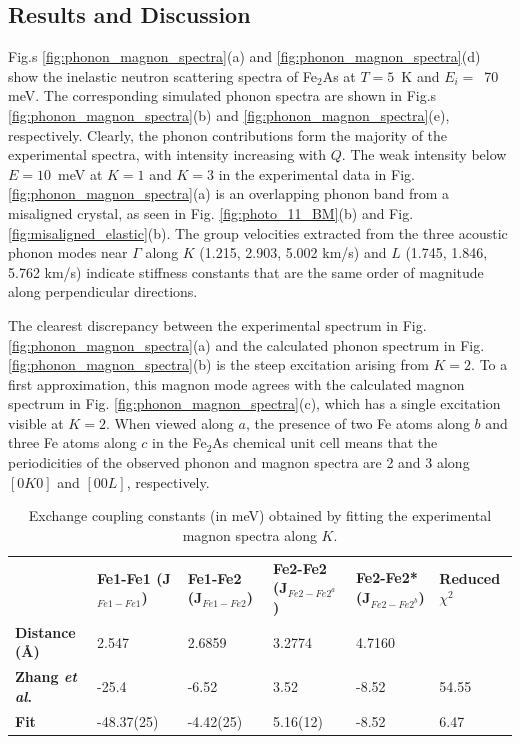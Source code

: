 \documentclass[letterpaper,10pt,doublespacing,edeposit]{uiucthesis2020}
\begin{document}
\begin{mainmatter}
\section{Results and Discussion}



Fig.s \ref{fig:phonon_magnon_spectra}(a) and \ref{fig:phonon_magnon_spectra}(d) show the inelastic neutron scattering spectra of Fe$_2$As at $T = 5$~K and $E_i =$~70 meV. The corresponding simulated phonon spectra are shown in Fig.s \ref{fig:phonon_magnon_spectra}(b) and \ref{fig:phonon_magnon_spectra}(e), respectively. Clearly, the phonon contributions form the majority of the experimental spectra, with intensity increasing with $Q$. 
The weak intensity below $E = 10$~meV  at $K = 1$ and $K = 3$ in the experimental data in Fig. \ref{fig:phonon_magnon_spectra}(a) is an overlapping phonon band from a misaligned crystal, as seen in Fig. \ref{fig:photo_11_BM}(b) and Fig. \ref{fig:misaligned_elastic}(b). The group velocities extracted from the three acoustic phonon modes near $\Gamma$ along $K$ (1.215, 2.903, 5.002 km/s) and $L$ (1.745, 1.846, 5.762 km/s) indicate stiffness constants that are the same order of magnitude along  perpendicular directions.




The clearest discrepancy between the experimental spectrum in Fig. \ref{fig:phonon_magnon_spectra}(a) and the calculated phonon spectrum in Fig. \ref{fig:phonon_magnon_spectra}(b) is the steep excitation arising from $K = 2$. To a first approximation, this magnon mode agrees with the calculated magnon spectrum in Fig. \ref{fig:phonon_magnon_spectra}(c), which has a single excitation visible at $K = 2$. When viewed along $a$, the presence of two Fe atoms along $b$ and three Fe atoms along $c$ in the Fe$_2$As chemical unit cell means that the periodicities of the observed phonon and magnon spectra are 2 and 3 along $[0K0]$ and $[00L]$, respectively.

\begin{table}
\caption{\label{tab:Jvalues} 
Exchange coupling constants (in meV) obtained by fitting the experimental magnon spectra along $K$. 
}
\centering
\begin{tabular}{p{3cm}p{2cm}p{2cm}p{2cm}p{2cm}p{2cm}}
\hline\hline
	&  \textbf{Fe1-Fe1 (J$_{Fe1-Fe1}$)} & \textbf{Fe1-Fe2 (J$_{Fe1-Fe2}$)} & \textbf{Fe2-Fe2 (J$_{Fe2-Fe2^a}$)} & \textbf{Fe2-Fe2* (J$_{Fe2-Fe2^b}$)} & \textbf{Reduced $\chi^2$} \\

\textbf{Distance (\AA)} & 2.547 & 2.6859 & 3.2774 & 4.7160\\
\hline\hline
\textbf{Zhang \emph{et al}.} & -25.4 & -6.52 & 3.52 & -8.52 & 54.55\\
\hline
\textbf{Fit} & -48.37(25) & -4.42(25) & 5.16(12) & -8.52 & 6.47\\
\hline\hline
\end{tabular}
~\\
\end{table}




\end{mainmatter}
\end{document}
